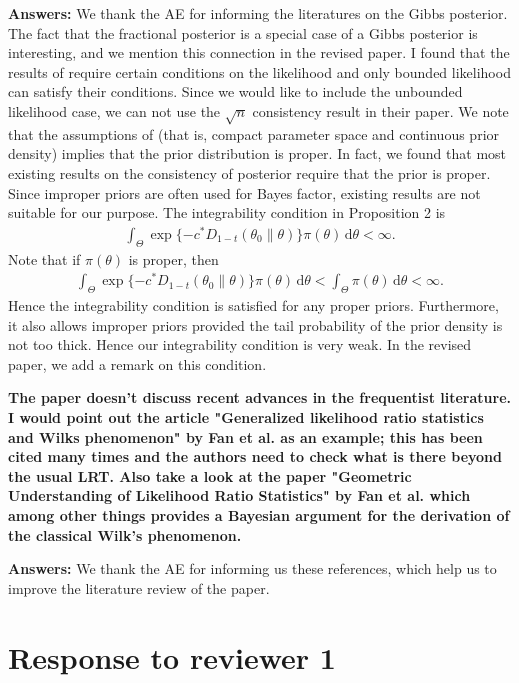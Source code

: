 \documentclass[11pt]{article}
\theoremstyle{plain}
\theoremstyle{definition}
\theoremstyle{remark}
\begin{document}
\textbf{Answers:}
We thank the AE for informing the literatures on the Gibbs posterior.
The fact that the fractional posterior is a special case of a Gibbs posterior is interesting, and we mention this connection in the revised paper.
I found that the results of \cite{Chernozhukov2003} require certain conditions on the likelihood and only bounded likelihood can satisfy their conditions.
Since we would like to include the unbounded likelihood case, we can not use the $\sqrt{n}$ consistency result in their paper.
We note that the assumptions of \cite{Chernozhukov2003} (that is, compact parameter space and continuous prior density) implies that the prior distribution is proper.
In fact, we found that most existing results on the consistency of posterior require that the prior is proper.
Since improper priors are often used for Bayes factor, existing results are not suitable for our purpose.
The integrability condition in Proposition 2 is
\begin{align*}
    \int_{\Theta} \exp\{ - c^* D_{1-t}(\theta_0 \| \theta )\} \pi(\theta) \, \mathrm d \theta < \infty.
\end{align*}
Note that if $\pi(\theta)$ is proper, then
\begin{align*}
    \int_{\Theta} \exp\{ - c^* D_{1-t}(\theta_0 \| \theta )\} \pi(\theta) \, \mathrm d \theta <
    \int_{\Theta} \pi(\theta) \, \mathrm d \theta < \infty.
\end{align*}
Hence the integrability condition is satisfied for any proper priors.
Furthermore, it also allows improper priors provided the tail probability of the prior density is not too thick.
Hence our integrability condition is very weak.
In the revised paper, we add a remark on this condition.


\textbf{
    The paper doesn't discuss recent advances in the frequentist literature. I would point out the article "Generalized likelihood ratio statistics and Wilks phenomenon" by Fan et al. as an example; this has been cited many times and the authors need to check what is there beyond the usual LRT. Also take a look at the paper "Geometric Understanding of Likelihood Ratio Statistics" by Fan et al. which among other things provides a Bayesian argument for the derivation of the classical Wilk's phenomenon.
}

\textbf{Answers:}
We thank the AE for informing us these references, which help us to improve the literature review of the paper.

\section{Response to reviewer 1}
\end{document}
